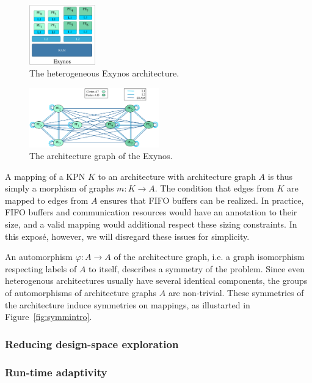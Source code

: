 \documentclass{article}
\begin{document}
\begin{figure}[t]
	\centering
	\includegraphics[width=0.255\textwidth]{figures/exynos.pdf}
	\caption{The heterogeneous Exynos architecture.}
	\label{fig:exynos}
\end{figure}

\begin{figure}[t]
	\centering
	\includegraphics[width=0.5\textwidth]{figures/exynos_archgraph.pdf}
	\caption{The architecture graph of the Exynos.}
	\label{fig:arch_graph}
\end{figure}

A mapping of a KPN $K$ to an architecture with architecture graph $A$ is thus simply a morphism of graphs $m: K \rightarrow A$. The condition that edges from $K$ are mapped to edges from $A$ ensures that FIFO buffers can be realized.
In practice, FIFO buffers and communication resources would have an annotation to their size, and a valid mapping would additional respect these sizing constraints. In this exposé, however, we will disregard these issues for simplicity.

An automorphism $\varphi: A \rightarrow A$ of the architecture graph, i.e. a graph isomorphism respecting labels of $A$ to itself, describes a symmetry of the problem.
Since even heterogenous architectures usually have several identical components, the groups of automorphisms of architecture graphs $A$ are non-trivial.
These symmetries of the architecture induce symmetries on mappings, as illustarted in Figure~\ref{fig:symmintro}.
\subsubsection{Reducing design-space exploration}

\subsubsection{Run-time adaptivity}
\end{document}

